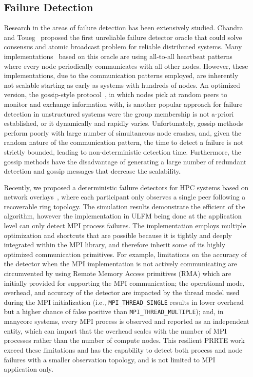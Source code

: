 \documentclass[sigconf]{acmart}
\newcommand{\mpifunc}[1]{\lstinline"MPI_#1"\xspace}
\newcommand{\prrte}[0]{\textsc{PRRTE}\xspace}
\newcommand{\ulfm}[0]{\textsc{ULFM}\xspace}
\newcommand{\mpi}[0]{\textsc{MPI}\xspace}
\begin{document}
\subsection{Failure Detection}
Research in the areas of failure detection has been extensively studied. Chandra and Toueg~\cite{Chandra96} proposed the first unreliable failure detector oracle that could solve consensus and atomic broadcast problem for reliable distributed systems. Many implementations~\cite{Wei02, Larrea00, Kawazoe97} based on this oracle are using all-to-all heartbeat patterns where every node periodically communicates with all other nodes. However, these implementations, due to the communication patterns employed, are inherently not scalable starting as early as systems with hundreds of nodes. An optimized version, the gossip-style protocol~\cite{van98, Ranganathan01, Gupta01, Abhinandan02}, in which nodes pick at random peers to monitor and exchange information with, is another popular approach for failure detection in unstructured systems were the group membership is not a-priori established, or it dynamically and rapidly varies. Unfortunately, gossip methods perform poorly with large number of simultaneous node crashes, and, given the random nature of the communication pattern, the time to detect a failure is not strictly bounded, leading to non-deterministic detection time. Furthermore, the gossip methods have the disadvantage of generating a large number of redundant detection and gossip messages that decrease the scalability.

Recently, we proposed a deterministic failure detectors for HPC systems based on network overlays~\cite{George16}, where each participant only observes a single peer following a recoverable ring topology.
The simulation results demonstrate the efficient of the algorithm, however the implementation in \ulfm being done at the application level can only detect \mpi process failures. The
implementation employs multiple optimization and shortcuts that are possible because it is
tightly and deeply integrated within the \mpi library, and therefore inherit some of its highly optimized communication primitives. For example, limitations on the
accuracy of the detector when the \mpi implementation is not actively communicating
are circumvented by using Remote Memory Access primitives (RMA) which are
initially provided for supporting the \mpi communication; the operational
mode, overhead, and accuracy of the detector are impacted by the thread model used
during the \mpi initialization (i.e., \mpifunc{THREAD_SINGLE} results
in lower overhead but a higher chance of false positive than \mpifunc{THREAD_MULTIPLE});
and, in manycore systems, every \mpi process
is observed and reported as an independent entity, which can impart that the
overhead scales with the number of \mpi processes rather than the number of
compute nodes. This resilient \prrte work
exceed these limitations and has the capability to detect both process and
node failures with a smaller observation topology, and is not limited to
MPI application only.
\end{document}
